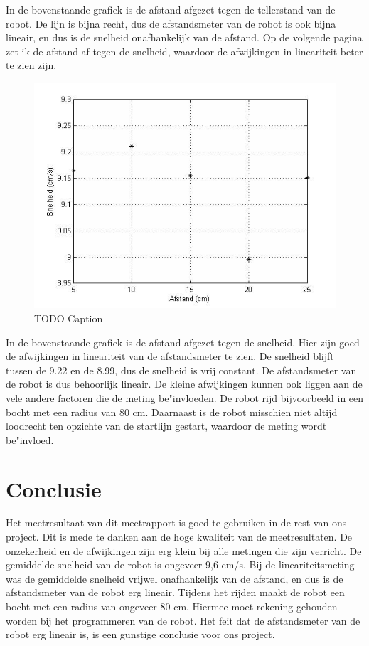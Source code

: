 \documentclass{report}
\begin{document}
In de bovenstaande grafiek is de afstand afgezet tegen de tellerstand van de robot. De lijn is bijna recht, dus de afstandsmeter van de robot is ook bijna lineair, en dus is de snelheid onafhankelijk van de afstand.  Op de volgende pagina zet ik de afstand af tegen de snelheid, waardoor de afwijkingen in lineariteit beter te zien zijn. 
\begin{figure}[H]
 \centering
\includegraphics[width=150mm] {afstand-snelheid.jpg}
\caption{TODO Caption}
\end{figure}
In de bovenstaande grafiek is de afstand afgezet tegen de snelheid. Hier zijn goed de afwijkingen in lineariteit van de afstandsmeter te zien. De snelheid blijft tussen de 9.22 en de 8.99, dus de snelheid is vrij constant. De afstandsmeter van de robot is dus behoorlijk lineair. De kleine afwijkingen kunnen ook liggen aan de vele andere factoren die de meting be"invloeden. De robot rijd bijvoorbeeld in een bocht met een radius van 80 cm. Daarnaast is de robot misschien niet altijd loodrecht ten opzichte van de startlijn gestart, waardoor de meting wordt be"invloed.
\newpage
\chapter{Conclusie}
Het meetresultaat van dit meetrapport is goed te gebruiken in de rest van ons project. Dit is mede te danken aan de hoge kwaliteit van de meetresultaten. De onzekerheid en de afwijkingen zijn erg klein bij alle metingen die zijn verricht. De gemiddelde snelheid van de robot is ongeveer 9,6 cm/s. Bij de lineariteitsmeting was de gemiddelde snelheid vrijwel onafhankelijk van de afstand, en dus is de afstandsmeter van de robot erg lineair. Tijdens het rijden maakt de robot een bocht met een radius van ongeveer 80 cm. Hiermee moet rekening gehouden worden bij het programmeren van de robot. Het feit dat de afstandsmeter van de robot erg lineair is, is een gunstige conclusie voor ons project.
\end{document}
